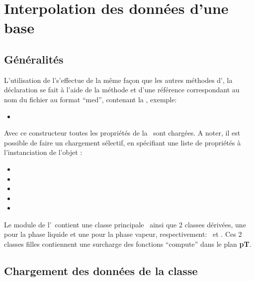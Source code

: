 \chapter{Interpolation des données d'une base}
  \section{Généralités}\label{general}
    L'utilisation de l'\ipp s'effectue de la même façon que les autres méthodes d'\EOS,
    la déclaration se fait à l'aide de la méthode \str{\IPP}
    et d'une référence correspondant au nom du fichier au format ``med'', contenant la \bdd, exemple:
    \vspace{0.3cm}
    \begin{itemize}
     \item[\ding{0}] 
    \end{itemize}
    \vspace{0.5cm}
    
    Avec ce constructeur toutes les propriétés de la \bdd\ sont chargées.
    \smallbreak
    \vspace{0.2cm}
    A noter, il est possible de faire un chargement sélectif, en spécifiant une liste de propriétés à l'instanciation de l'objet \EOS: 
    
    \vspace{0.3cm}
    \begin{itemize}
      \item[\ding{0}] 
      \item[\ding{0}] 
      \item[\ding{0}] 
      \item[\ding{0}] 
      \item[\ding{0}] 
    \end{itemize}
    \vspace{0.5cm}
     
    Le module de l'\ipp\ contient une classe principale \IPP\ ainsi que 2 classes dérivées, une pour la phase liquide et une pour la phase vapeur,
    respectivement: \IPPl\  et \IPPv. Ces 2 classes filles contiennent une surcharge des fonctions ``compute'' dans le plan \textbf{pT}.


    \section{Chargement des données de la classe \IPP}
       
